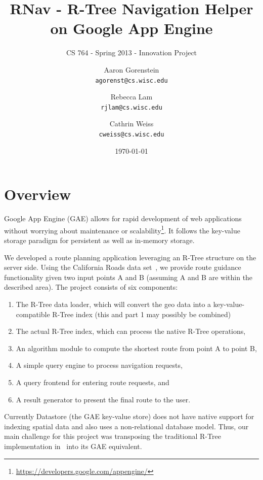 \documentclass{scrartcl}
\newcommand{\email}[1]{\texttt{#1}}
\begin{document}
\title{RNav - R-Tree Navigation Helper on Google App Engine}
\subtitle{CS 764 - Spring 2013 - Innovation Project}

\author{
Aaron Gorenstein\\
	\email{agorenst@cs.wisc.edu}
\and
Rebecca Lam\\
	\email{rjlam@cs.wisc.edu}
\and
Cathrin Weiss\\
	\email{cweiss@cs.wisc.edu}       
}

\date{\today}

\maketitle

\section{Overview}
\label{sec:intro}
Google App Engine (GAE) allows for rapid development of web applications without worrying about maintenance or scalability\footnote{\url{https://developers.google.com/appengine/}}. It follows the key-value storage paradigm for persistent as well as in-memory storage. 

We developed a route planning application leveraging an R-Tree structure on the server side. Using the California Roads data set~\cite{Online:cardata}, we provide route guidance functionality given two input points A and B (assuming A and B are within the described area). The project consists of six components:

\begin{enumerate}
\item The R-Tree data loader, which will convert the geo data into a key-value-compatible R-Tree index (this and part 1 may possibly be combined)
\item The actual R-Tree index, which can process the native R-Tree operations,
\item An algorithm module to compute the shortest route from point A to point B,
\item A simple query engine to process navigation requests, 
\item A query frontend for entering route requests, and
\item A result generator to present the final route to the user. 
\end{enumerate}

Currently Datastore (the GAE key-value store) does not have native support for indexing spatial data and also uses a non-relational database model. Thus, our main challenge for this project was transposing the traditional R-Tree implementation in~\cite{DBLP:conf/sigmod/Guttman84} into its GAE equivalent.
\end{document}
